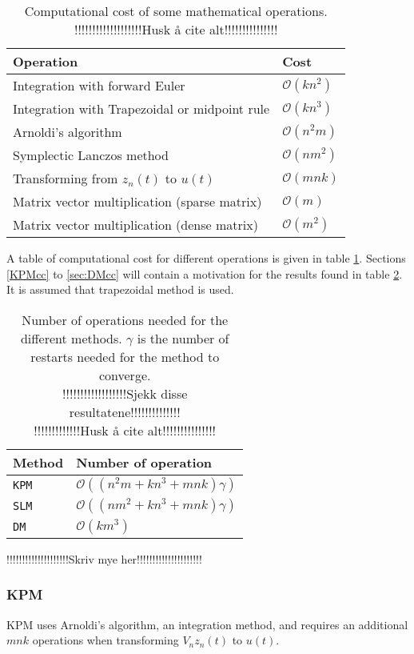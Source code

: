 \begin{table}
\begin{tabular}{l l }
Operation & Cost \\
\hline
Integration with forward Euler & $\mathcal{O}(k n^2)$ \\
Integration with Trapezoidal or midpoint rule & $\mathcal{O}(k n^3)$ \\
Arnoldi's algorithm & $ \mathcal{ O }(n^2 m)$ \\
Symplectic Lanczos method & $ \mathcal{O}(n m^2) $\\
Transforming from $z_n(t)$ to $u(t)$ & $ \mathcal{O}(mnk) $\\
Matrix vector multiplication (sparse matrix) & $ \mathcal{O}(m) $ \\
Matrix vector multiplication (dense matrix) & $ \mathcal{O}(m^2) $
\end{tabular}
\label{tab:cd}
\caption{Computational cost of some mathematical operations.
!!!!!!!!!!!!!!!!!!!Husk å cite alt!!!!!!!!!!!!!!!}
\end{table}

A table of computational cost for different operations is given in table \ref{tab:cd}. Sections \ref{KPMcc} to \ref{sec:DMcc} will contain a motivation for the results found in table \ref{tab:cc}. It is assumed that trapezoidal method is used. \\

\begin{table}
\begin{tabular}{l | l}
Method & Number of operation \\
\hline
\texttt{KPM} & $ \mathcal{O}((n^2 m + k n^3 + mnk)\gamma)$ \\ 
\texttt{SLM} & $ \mathcal{O}((n m^2 + k n^3 + mnk)\gamma) $  \\
\texttt{DM} & $\mathcal{O}(km^3)$ \\
\end{tabular}
\label{tab:cc}
\caption{Number of operations needed for the different methods. $\gamma$ is the number of restarts needed for the method to converge. 
\\!!!!!!!!!!!!!!!!!!Sjekk disse resultatene!!!!!!!!!!!!!!\\!!!!!!!!!!!!!Husk å cite alt!!!!!!!!!!!!!!!}
\end{table}
!!!!!!!!!!!!!!!!!!!!Skriv mye her!!!!!!!!!!!!!!!!!!!!!\\

\subsubsection{KPM} \label{sec:KPMcc}
KPM uses Arnoldi's algorithm, an integration method, and requires an additional $mnk$ operations when transforming $V_n z_n(t)$ to $ u(t)$.

